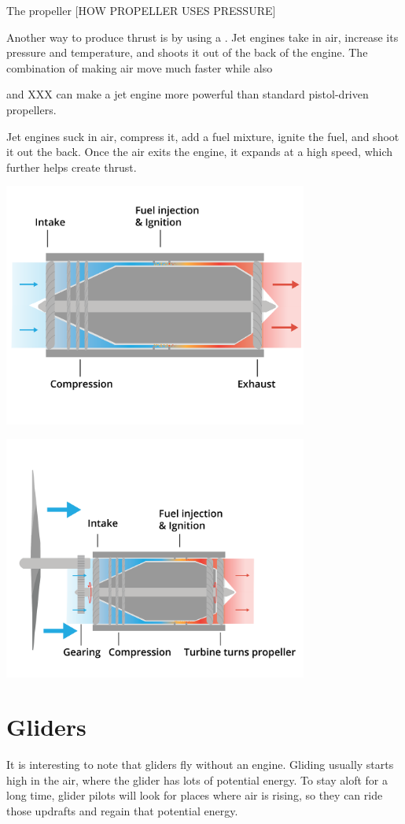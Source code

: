 The propeller [HOW PROPELLER USES PRESSURE]


Another way to produce thrust is by using a . Jet engines take in air, increase its pressure and temperature, and shoots it out of the back of the engine. The combination of making air move much faster while also 

and XXX can make a jet engine more powerful than standard pistol-driven propellers. 


Jet engines suck in air, compress it, add a fuel mixture, ignite the fuel, and shoot it out the back. Once the air exits the engine, it expands at a high speed, which further helps create thrust. 




\includegraphics[width=0.75\textwidth]{jet.png}



\includegraphics[width=0.75\textwidth]{turboProp.png}


\section{Gliders}

It is interesting to note that gliders fly without an engine. Gliding usually starts high in the air,  where the glider has lots of potential energy. To stay aloft for a long
time, glider pilots will look for places where air is rising, so they can ride those updrafts and regain that potential energy.

